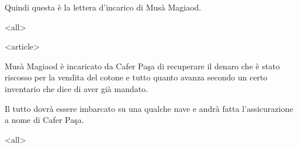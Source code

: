 Quindi questa è la lettera d'incarico di Musà Magiaod.

\mode
<all>




\mode
<article>

Musà Magiaod è incaricato da Cafer  Paşa di recuperare il denaro che è
stato riscosso per la vendita del cotone e tutto quanto avanza secondo
un certo inventario che dice di aver già mandato.

Il  tutto dovrà essere  imbarcato su  una qualche  nave e  andrà fatta
l'assicurazione a nome di Cafer Paşa.

\mode
<all>

